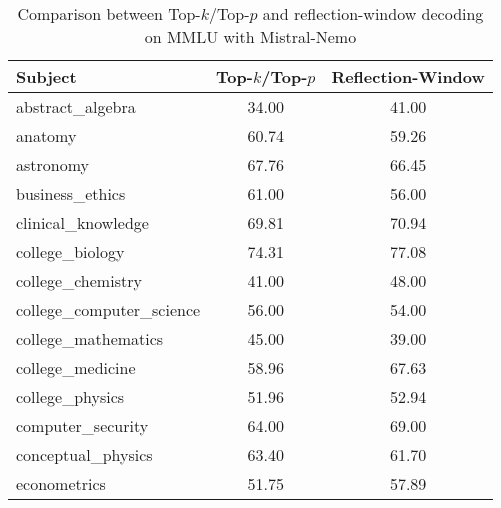 \newpage
\begingroup
\renewcommand{\arraystretch}{1}
\begin{table}[t]
    \caption{Comparison between Top-$k$/Top-$p$ and reflection-window decoding on MMLU with Mistral-Nemo}
    \label{tab:decoding_comparison_mistral}
    \centering
    \footnotesize
    \begin{tabular}{L{0.35}C{0.20}C{0.20}}
        \toprule
        \textbf{Subject}                        & \textbf{Top-$k$/Top-$p$} & \textbf{Reflection-Window} \\
        \midrule
        abstract\_algebra                       & 34.00                    & 41.00                      \\
        anatomy                                 & 60.74                    & 59.26                      \\
        astronomy                               & 67.76                    & 66.45                      \\
        business\_ethics                        & 61.00                    & 56.00                      \\
        clinical\_knowledge                     & 69.81                    & 70.94                      \\
        college\_biology                        & 74.31                    & 77.08                      \\
        college\_chemistry                      & 41.00                    & 48.00                      \\
        college\_computer\_science              & 56.00                    & 54.00                      \\
        college\_mathematics                    & 45.00                    & 39.00                      \\
        college\_medicine                       & 58.96                    & 67.63                      \\
        college\_physics                        & 51.96                    & 52.94                      \\
        computer\_security                      & 64.00                    & 69.00                      \\
        conceptual\_physics                     & 63.40                    & 61.70                      \\
        econometrics                            & 51.75                    & 57.89                      \\

\end{tabular}
\end{table}
